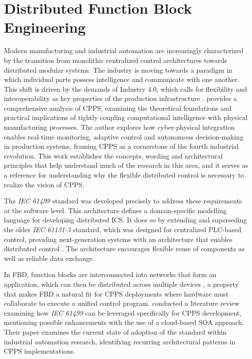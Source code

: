 \section{Distributed Function Block Engineering}
Modern manufacturing and industrial automation are increasingly characterized by the transition from monolithic centralized control architectures towards distributed modular systems. The industry is moving towards a paradigm in which individual parts possess intelligence and communicate with one another. This shift is driven by the demands of Industry 4.0, which calls for flexibility and interoperability as key properties of the production infrastructure \cite{folgado_review_2024}. \citeauthor{monostori_cyber-physical_2014} \cite{monostori_cyber-physical_2014} provides a comprehensive analysis of \ac{CPPS}, examining the theoretical foundations and practical implications of tightly coupling computational intelligence with physical manufacturing processes. The author explores how cyber-physical integration enables real-time monitoring, adaptive control and autonomous decision-making in production systems, framing \ac{CPPS} as a cornerstone of the fourth industrial revolution. This work establishes the concepts, wording and architectural principles that help understand much of the research in this area, and it serves as a reference for understanding why the flexible distributed control is necessary to realize the vision of \ac{CPPS}.

The \textit{IEC 61499} standard was developed precisely to address these requirements at the software level. This architecture defines a domain-specific modelling language for developing distributed \ac{ICS}. It does so by extending and superseding the older \textit{IEC 61131-3} standard, which was designed for centralized \ac{PLC}-based control, providing next-generation systems with an architecture that enables distributed control \cite{bencherki_iec_2024}. The architecture encourages flexible reuse of components as well as reliable data exchange.

In \ac{FBD}, function blocks are interconnected into networks that form an application, which can then be distributed across multiple devices \cite{liang_kind_2008}, a property that makes \ac{FBD} a natural fit for \ac{CPPS} deployments where hardware must collaborate to execute a unified control program. \citeauthor{torres_literature_2025} \cite{torres_literature_2025} conducted a literature review examining how \textit{IEC 61499} can be leveraged specifically for \ac{CPPS} development, mentioning possible enhancements with the use of a cloud-based \ac{SOA} approach. Their paper examines the current state of adoption of the standard within industrial automation research, identifying recurring architectural patterns in \ac{CPPS} implementations.

